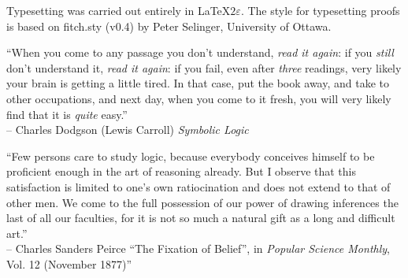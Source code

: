 \vfill

Typesetting was carried out entirely in \LaTeX$2\varepsilon$. The style for typesetting proofs is based on fitch.sty (v0.4) by Peter Selinger, University of Ottawa.





\pagebreak

``When you come to any passage you don't understand, \emph{read it again}: if you \emph{still} don't understand it, \emph{read it again}: if you fail, even after \emph{three} readings, very likely your brain is getting a little tired. In that case, put the book away, and take to other occupations, and next day, when you come to it fresh, you will very likely find that it is \emph{quite} easy.'' \\
-- Charles Dodgson (Lewis Carroll) \emph{Symbolic Logic} \parencite*{Dodgson1896}

\vspace{1cm}

``Few persons care to study logic, because everybody conceives himself to be proficient enough in the art of reasoning already. But I observe that this satisfaction is limited to one's own ratiocination and does not extend to that of other men. We come to the full possession of our power of drawing inferences the last of all our faculties, for it is not so much a natural gift as a long and difficult art.'' \\
-- Charles Sanders Peirce ``The Fixation of Belief'', in \textit{Popular Science Monthly}, Vol. 12 (November 1877)''
